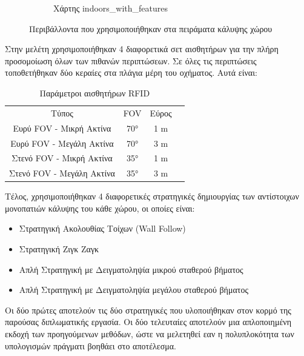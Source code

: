 \begin{figure}
\begin{subfigure}[b]{\textwidth}
         \label{fig:indoors_with_features_ogm}
         \caption{Χάρτης indoors\_with\_features}
     \end{subfigure}
    \caption{Περιβάλλοντα που χρησιμοποιήθηκαν στα πειράματα κάλυψης χώρου}
    \label{fig:experiments_maps}
\end{figure}

Στην μελέτη χρησιμοποιήθηκαν 4 διαφορετικά σετ αισθητήρων για την πλήρη προσομοίωση όλων των πιθανών περιπτώσεων. Σε όλες τις περιπτώσεις τοποθετήθηκαν δύο κεραίες στα πλάγια μέρη του οχήματος. Αυτά είναι:

\begin{table}[H]
    \begin{center}
        \caption{Παράμετροι αισθητήρων RFID}
        \label{tab:rfid_configs}
        \begin{tabular}{ | c | c | c | c |}
        \hline
        \rowcolor{Gray}
        Τύπος & FOV & Εύρος\\
        Ευρύ FOV - Μικρή Ακτίνα & \ang{70} &  1 \si{m} \\ 
        Ευρύ FOV - Μεγάλη Ακτίνα & \ang{70} &  3 \si{m} \\
        Στενό FOV - Μικρή Ακτίνα & \ang{35} &  1 \si{m} \\
        Στενό FOV - Μεγάλη Ακτίνα & \ang{35} &  3 \si{m} \\
        
        \hline
        \end{tabular}
    \end{center}
\end{table}

Τέλος, χρησιμοποιήθηκαν 4 διαφορετικές στρατηγικές δημιουργίας των αντίστοιχων μονοπατιών κάλυψης του κάθε χώρου, οι οποίες είναι:
\begin{itemize}
    \setlength\itemsep{-0.2em}
    \item Στρατηγική Ακολουθίας Τοίχων (Wall Follow)
    \item Στρατηγική Ζιγκ Ζαγκ
    \item Απλή Στρατηγική με Δειγματοληψία μικρού σταθερού βήματος
    \item Απλή Στρατηγική με Δειγματοληψία μεγάλου σταθερού βήματος
\end{itemize}
Οι δύο πρώτες αποτελούν τις δύο στρατηγικές που υλοποιήθηκαν στον κορμό της παρούσας διπλωματικής εργασία. Οι δύο τελευταίες αποτελούν μια απλοποιημένη εκδοχή των προηγούμενων μεθόδων, ώστε να μελετηθεί εαν η πολυπλοκότητα των υπολογισμών πράγματι βοηθάει στο αποτέλεσμα.

